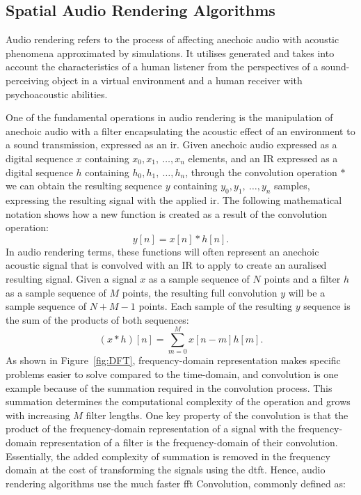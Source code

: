 \subsection{Spatial Audio Rendering Algorithms}
\label{sec:real-time-conv}
Audio rendering refers to the process of affecting anechoic audio with acoustic phenomena approximated by simulations. It utilises generated  and takes into account the characteristics of a human listener from the perspectives of a sound-perceiving object in a virtual environment and a human receiver with psychoacoustic abilities.\par
One of the fundamental operations in audio rendering is the manipulation of anechoic audio with a filter encapsulating the acoustic effect of an environment to a sound transmission, expressed as an \acrshort{ir}. Given anechoic audio expressed as a digital sequence $x$ containing $x_0, x_1,~\dots,x_n$ elements, and an IR expressed as a digital sequence $h$ containing $h_0, h_1,~\dots,h_n$, through the convolution operation $*$ we can obtain the resulting sequence $y$ containing $y_0, y_1,~\dots, y_n$ samples, expressing the resulting signal with the applied \acrshort{ir}. The following mathematical notation shows how a new function is created as a result of the convolution operation:
\begin{equation}
    y[n] = x[n] * h[n].
\label{eq:1d-convolution}
\end{equation}
In audio rendering terms, these functions will often represent an anechoic acoustic signal that is convolved with an IR to apply to create an auralised resulting signal. Given a signal $x$ as a sample sequence of $N$ points and a filter $h$ as a sample sequence of $M$ points, the resulting full convolution $y$ will be a sample sequence of $N + M - 1$ points. Each sample of the resulting $y$ sequence is the sum of the products of both sequences: 
\begin{equation}
    (x * h)[n] = \sum_{m=0}^{M}x[n-m]h[m].
\end{equation}
As shown in Figure~\ref{fig:DFT}, frequency-domain representation makes specific problems easier to solve compared to the time-domain, and convolution is one example because of the summation required in the convolution process. This summation determines the computational complexity of the operation and grows with increasing $M$ filter lengths. One key property of the convolution is that the product of the frequency-domain representation of a signal with the frequency-domain representation of a filter is the frequency-domain of their convolution. Essentially, the added complexity of summation is removed in the frequency domain at the cost of transforming the signals using the \acrshort{dtft}. Hence, audio rendering algorithms use the much faster \acrfull{fft} Convolution, commonly defined as:
